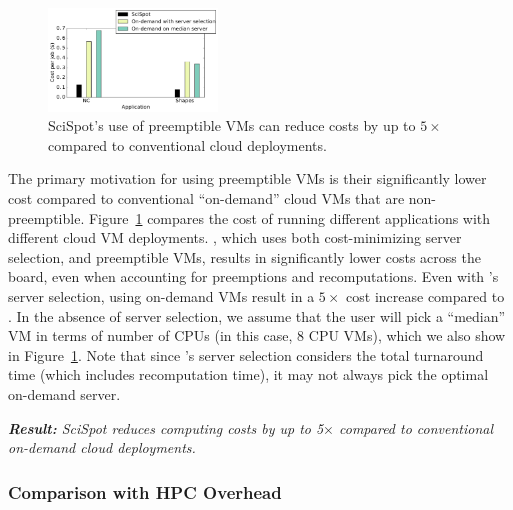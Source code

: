 \begin{figure}
  \centering
  \includegraphics[width=0.4\textwidth]{../graphs/cost-only-bar.pdf}
  \vspace*{\myfigspace}
  \caption{SciSpot's use of preemptible VMs can reduce costs by up to $5\times$ compared to conventional cloud deployments.}
  \label{fig:cost-only-bar}
    \vspace*{\myfigspace}
\end{figure}


The primary motivation for using preemptible VMs is their significantly lower cost compared to conventional ``on-demand'' cloud VMs that are non-preemptible. 
Figure~\ref{fig:cost-only-bar} compares the cost of running different applications with different cloud VM deployments.
\sysname, which uses both cost-minimizing server selection, and preemptible VMs, results in significantly lower costs across the board, even when accounting for preemptions and recomputations. 
Even with \sysname's server selection, using on-demand VMs result in a $5\times$ cost increase compared to \sysname.
In the absence of server selection, we assume that the user will pick a ``median'' VM in terms of number of CPUs (in this case, 8 CPU VMs), which we also show in Figure~\ref{fig:cost-only-bar}.
Note that since \sysname's server selection considers the total turnaround time (which includes recomputation time), it may not always pick the optimal on-demand server. 



\noindent \emph{\textbf{Result:} SciSpot reduces computing costs by up to 5$\times$ compared to conventional on-demand cloud deployments.}

\subsubsection{Comparison with HPC Overhead}

